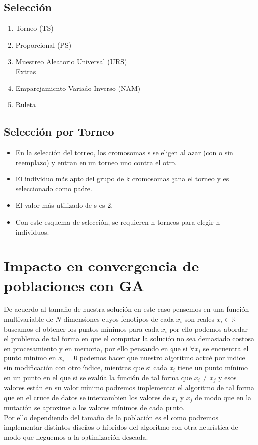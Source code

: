 \documentclass[10pt]{article}
\begin{document}
\subsection{Selección}
\begin{enumerate}
  \item Torneo (TS)
  \item Proporcional (PS)
  \item Muestreo Aleatorio Universal (URS)
  \\Extras
  \item Emparejamiento Variado Inverso (NAM)
  \item Ruleta
\end{enumerate}
\subsection{Selección por Torneo }
\begin{itemize}
  \item En la selección del torneo, los cromosomas s se eligen al azar (con o sin reemplazo) y entran en un torneo uno contra el otro.
  \item El individuo más apto del grupo de k cromosomas gana el torneo y es seleccionado como padre.
  \item El valor más utilizado de s es 2.
  \item Con este esquema de selección, se requieren n torneos para elegir n individuos.
\end{itemize}
\section{Impacto en convergencia de poblaciones con GA}
De acuerdo al tamaño de nuestra solución en este caso pensemos en una función multivariable de $N$ dimensiones cuyos fenotipos de cada $x_{i}$ son reales $x_{i}\in\mathbb{R}$ buscamos el obtener los puntos mínimos para cada $x_{i}$ por ello podemos abordar el problema de tal forma en que el computar la solución no sea demasiado costosa en procesamiento y en memoria, por ello pensando en que si $\forall x_{i}$ se encuentra el punto mínimo en $x_{i}=0$ podemos hacer que nuestro algoritmo actué por índice sin modificación con otro índice, mientras que si cada $x_{i}$ tiene un punto mínimo en un punto en el que si se evalúa la función de tal forma que $x_{i}\neq x_{j}$ y esos valores están en su valor mínimo podremos implementar el algoritmo de tal forma que en el cruce de datos se intercambien los valores de $x_{i}$ y $x_{j}$ de modo que en la mutación se aproxime a los valores mínimos de cada punto.\\
Por ello dependiendo del tamaño de la población es el como podremos implementar distintos diseños o híbridos del algoritmo con otra heurística de modo que lleguemos a la optimización deseada.
\end{document}
